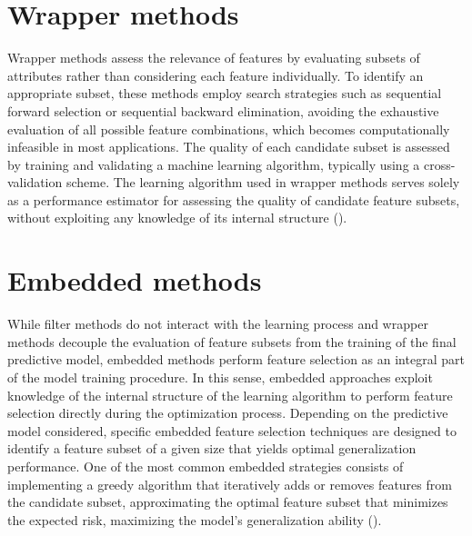\documentclass[12pt]{report} %
\begin{document}
\section{Wrapper methods} \label{sec:wrapper-methods}

Wrapper methods assess the relevance of features by evaluating subsets of attributes rather than considering each feature individually. To identify an appropriate subset, these methods employ search strategies such as sequential forward selection or sequential backward elimination, avoiding the exhaustive evaluation of all possible feature combinations, which becomes computationally infeasible in most applications. The quality of each candidate subset is assessed by training and validating a machine learning algorithm, typically using a cross-validation scheme. The learning algorithm used in wrapper methods serves solely as a performance estimator for assessing the quality of candidate feature subsets, without exploiting any knowledge of its internal structure (\cite{guyon2006feature}).


\section{Embedded methods} \label{sec:embedded-methods}

While filter methods do not interact with the learning process and wrapper methods decouple the evaluation of feature subsets from the training of the final predictive model, embedded methods perform feature selection as an integral part of the model training procedure. In this sense, embedded approaches exploit knowledge of the internal structure of the learning algorithm to perform feature selection directly during the optimization process. Depending on the predictive model considered, specific embedded feature selection techniques are designed to identify a feature subset of a given size that yields optimal generalization performance. One of the most common embedded strategies consists of implementing a greedy algorithm that iteratively adds or removes features from the candidate subset, approximating the optimal feature subset that minimizes the expected risk, maximizing the model's generalization ability (\cite{zaki2014data}).
\end{document}
